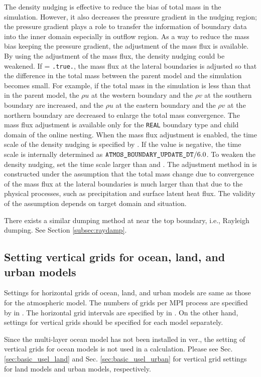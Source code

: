 The density nudging is effective to reduce the bias of total mass in the simulation. However, it also decreases the pressure gradient in the nudging region; the pressure gradient plays a role to transfer the information of boundary data into the inner domain especially in outflow region.
As a way to reduce the mass bias keeping the pressure gradient, the adjustment of the mass flux is available.
By using the adjustment of the mass flux, the density nudging could be weakened.
%
If  = \verb|.true.|,
the mass flux at the lateral boundaries is adjusted so that the difference in the total mass between the parent model and the simulation becomes small.
For example, if the total mass in the simulation is less than that in the parent model, the $\rho u$ at the western boundary and the $\rho v$ at the southern boundary are increased, and the $\rho u$ at the eastern boundary and the $\rho v$ at the northern boundary are decreased to enlarge the total mass convergence.
The mass flux adjustment is available only for the \verb|REAL| boundary type and child domain of the online nesting.
When the mass flux adjustment is enabled, the time scale of the density nudging is specified by .
If the value is negative, the time scale is internally determined as $\nmitemeq{ATMOS_BOUNDARY_UPDATE_DT} / 6.0$.
To weaken the density nudging, set the time scale larger than  and .
The adjustment method in \scalerm is constructed under the assumption that the total mass change due to convergence of the mass flux at the lateral boundaries is much larger than that due to the physical processes, such as precipitation and surface latent heat flux.
The validity of the assumption depends on target domain and situation.

There exists a similar dumping method at near the top boundary, i.e., Rayleigh dumping. See Section \ref{subsec:raydamp}.

\subsection{Setting vertical grids for ocean, land, and urban models} \label{subsec:gridolu}

Settings for horizontal grids of ocean, land, and urban models are same as those for the atmospheric model.
The numbers of grids per MPI process are specified by  in .
The horizontal grid intervals are specified by  in .
On the other hand, settings for vertical grids should be specified for each model separately.

Since the multi-layer ocean model has not been installed in \scale ver.\version,
the setting of vertical grids for ocean models is not used in a calculation. %
Please see Sec. \ref{sec:basic_usel_land} and Sec. \ref{sec:basic_usel_urban}
for vertical grid settings for land models and urban models, respectively.
